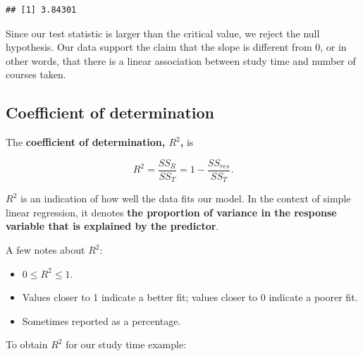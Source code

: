 \documentclass[
]{book}
\newenvironment{Shaded}{\begin{snugshade}}{\end{snugshade}}
\newcommand{\DecValTok}[1]{\textcolor[rgb]{0.00,0.00,0.81}{#1}}
\newcommand{\DocumentationTok}[1]{\textcolor[rgb]{0.56,0.35,0.01}{\textbf{\textit{#1}}}}
\newcommand{\FunctionTok}[1]{\textcolor[rgb]{0.13,0.29,0.53}{\textbf{#1}}}
\newcommand{\NormalTok}[1]{#1}
\newcommand{\OtherTok}[1]{\textcolor[rgb]{0.56,0.35,0.01}{#1}}
\newcommand{\SpecialCharTok}[1]{\textcolor[rgb]{0.81,0.36,0.00}{\textbf{#1}}}
\newcommand{\StringTok}[1]{\textcolor[rgb]{0.31,0.60,0.02}{#1}}
\providecommand{\tightlist}{%
  \setlength{\itemsep}{0pt}\setlength{\parskip}{0pt}}
\begin{document}
\begin{verbatim}
## [1] 3.84301
\end{verbatim}

Since our test statistic is larger than the critical value, we reject the null hypothesis. Our data support the claim that the slope is different from 0, or in other words, that there is a linear association between study time and number of courses taken.

\subsection{Coefficient of determination}\label{coefficient-of-determination}

The \textbf{coefficient of determination, \(R^2\),} is

\begin{equation}
R^{2} = \frac{SS_R}{SS_T} = 1 - \frac{SS_{res}}{SS_T}.
\label{eq:R2}
\end{equation}

\(R^{2}\) is an indication of how well the data fits our model. In the context of simple linear regression, it denotes \textbf{the proportion of variance in the response variable that is explained by the predictor}.

A few notes about \(R^2\):

\begin{itemize}
\tightlist
\item
  \(0 \leq R^2 \leq 1\).
\item
  Values closer to 1 indicate a better fit; values closer to 0 indicate a poorer fit.
\item
  Sometimes reported as a percentage.
\end{itemize}

To obtain \(R^2\) for our study time example:

\begin{Shaded}
\end{Shaded}
\end{document}
